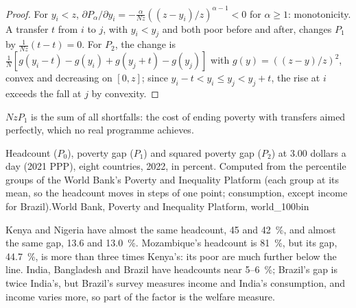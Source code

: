 \begin{proof}
For $y_i < z$, $\partial P_\alpha/\partial y_i = -\frac{\alpha}{Nz}((z - y_i)/z)^{\alpha - 1} < 0$ for $\alpha \ge 1$: monotonicity. A transfer $t$ from $i$ to $j$, with $y_i < y_j$ and
both poor before and after, changes $P_1$ by $\frac{1}{Nz}(t - t) = 0$. For $P_2$, the change is $\frac1N[g(y_i - t) - g(y_i) + g(y_j + t) - g(y_j)]$ with $g(y) = ((z - y)/z)^2$, convex and
decreasing on $[0, z]$; since $y_i - t < y_i \le y_j < y_j + t$, the rise at $i$ exceeds the fall at $j$ by convexity.
\end{proof}

$N z P_1$ is the sum of all shortfalls: the cost of ending poverty with transfers aimed
perfectly, which no real programme achieves.

\begin{omchart}{Headcount ($P_0$), poverty gap ($P_1$) and squared poverty gap ($P_2$) at 3.00 dollars a day
(2021 PPP), eight countries, 2022, in percent. Computed from the percentile groups of
the World Bank's Poverty and Inequality Platform (each group at its mean, so the
headcount moves in steps of one point; consumption, except income for Brazil).}{World
Bank, Poverty and Inequality Platform, world\_100bin}
\end{omchart}

Kenya and Nigeria have almost the same headcount, 45 and 42~\%, and almost the same gap, 13.6 and
13.0~\%. Mozambique's headcount is 81~\%, but its gap, 44.7~\%, is more than three times Kenya's: its poor are
much further below the line. India, Bangladesh and Brazil have headcounts near 5--6~\%; Brazil's gap is
twice India's, but Brazil's survey measures income and India's consumption, and
income varies more, so part of the factor is the welfare measure.

